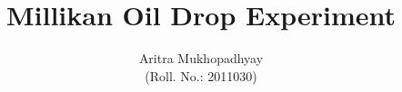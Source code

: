 \documentclass[10pt]{article}
\title{\textbf{Millikan Oil Drop Experiment}}
\author{Aritra Mukhopadhyay\\(Roll. No.: 2011030)}
\date{}
\begin{document}
    \maketitle
    
    \begin{multicols*}{2}
        
        
        
        
        
        

        
        
        \nocite{*}
    \end{multicols*}

    \pagebreak
\end{document}
